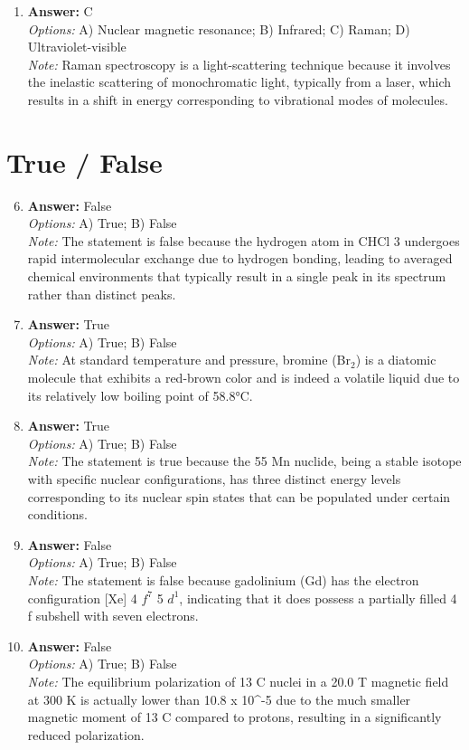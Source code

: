 \documentclass[12pt]{article}
\begin{document}
\begin{enumerate}[label=\arabic*.]
\\ \textit{Note:} Cobalt-60 is produced through a nuclear reaction where cobalt-59 absorbs a neutron, leading to its transformation into cobalt-60, which is utilized in radiation therapy for cancer treatment.
\item \textbf{Answer:} C
\\ \textit{Options:} A) Nuclear magnetic resonance; B) Infrared; C) Raman; D) Ultraviolet-visible
\\ \textit{Note:} Raman spectroscopy is a light-scattering technique because it involves the inelastic scattering of monochromatic light, typically from a laser, which results in a shift in energy corresponding to vibrational modes of molecules.
\end{enumerate}

\section*{True / False}
\begin{enumerate}[label=\arabic*.]
\setcounter{enumi}{5}
\item \textbf{Answer:} False
\\ \textit{Options:} A) True; B) False
\\ \textit{Note:} The statement is false because the hydrogen atom in CHCl 3 undergoes rapid intermolecular exchange due to hydrogen bonding, leading to averaged chemical environments that typically result in a single peak in its spectrum rather than distinct peaks.
\item \textbf{Answer:} True
\\ \textit{Options:} A) True; B) False
\\ \textit{Note:} At standard temperature and pressure, bromine (Br$_{2}$) is a diatomic molecule that exhibits a red-brown color and is indeed a volatile liquid due to its relatively low boiling point of 58.8°C.
\item \textbf{Answer:} True
\\ \textit{Options:} A) True; B) False
\\ \textit{Note:} The statement is true because the 55 Mn nuclide, being a stable isotope with specific nuclear configurations, has three distinct energy levels corresponding to its nuclear spin states that can be populated under certain conditions.
\item \textbf{Answer:} False
\\ \textit{Options:} A) True; B) False
\\ \textit{Note:} The statement is false because gadolinium (Gd) has the electron configuration [Xe] 4 $f^7$ 5 $d^1$, indicating that it does possess a partially filled 4 f subshell with seven electrons.
\item \textbf{Answer:} False
\\ \textit{Options:} A) True; B) False
\\ \textit{Note:} The equilibrium polarization of 13 C nuclei in a 20.0 T magnetic field at 300 K is actually lower than 10.8 x 10^-5 due to the much smaller magnetic moment of 13 C compared to protons, resulting in a significantly reduced polarization.
\end{enumerate}
\end{document}
